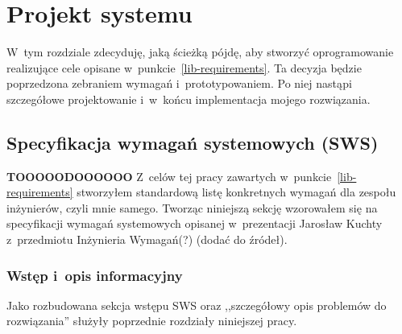 \chapter{Projekt systemu}
W~tym rozdziale zdecyduję, jaką ścieżką pójdę, aby stworzyć oprogramowanie realizujące cele opisane w~punkcie~\ref{lib-requirements}.
Ta decyzja będzie poprzedzona zebraniem wymagań i~prototypowaniem.
Po niej nastąpi szczegółowe projektowanie i~w~końcu implementacja mojego rozwiązania.



\section{Specyfikacja wymagań systemowych (SWS)}
\textbf{TOOOOODOOOOOO}
Z~celów tej pracy zawartych w~punkcie~\ref{lib-requirements} stworzyłem standardową listę konkretnych wymagań dla zespołu inżynierów, czyli mnie samego.
Tworząc niniejszą sekcję wzorowałem się na specyfikacji wymagań systemowych opisanej w~prezentacji Jarosław Kuchty z~przedmiotu Inżynieria Wymagań(?) (dodać do źródeł).


\subsection{Wstęp i~opis informacyjny}
Jako rozbudowana sekcja wstępu SWS oraz ,,szczegółowy opis problemów do rozwiązania'' służyły poprzednie rozdziały niniejszej pracy.

